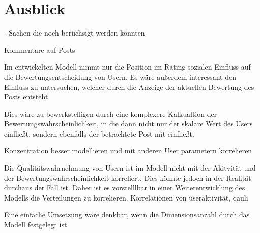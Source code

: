 \chapter{Ausblick}

- Sachen die noch berüchsigt werden könnten

Kommentare auf Posts

Im entwickelten Modell nimmt nur die Position im Rating sozialen Einfluss auf die Bewertungsentscheidung von Usern. Es wäre außerdem interessant den Einfluss zu untersuchen, welcher durch die Anzeige der aktuellen Bewertung des Posts entsteht

Dies wäre zu bewerkstelligen durch eine komplexere Kalkualtion der Bewertungswahrscheinlichkeit, in die dann nicht nur der skalare Wert des Users einfließt, sondern ebenfalls der betrachtete Post mit einfließt.


Konzentration besser modellieren und mit anderen User parametern korrelieren

Die Qualitätswahrnehmung von Usern ist im Modell nicht mit der Akitvität und der Bewertungswahrscheinlichkeit korreliert. Dies könnte jedoch in der Realität durchaus der Fall ist. Daher ist es vorstelllbar in einer Weiterentwicklung des Modells die Verteilungen zu korrelieren. 
Korrelationen von useraktivität, qauli

Eine einfache Umsetzung wäre denkbar, wenn die Dimensionsanzahl durch das Modell festgelegt ist